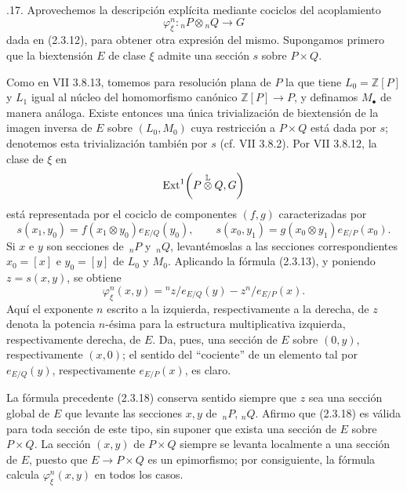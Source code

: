 \par\medskip
{}.17. Aprovechemos la descripción explícita mediante
cociclos del acoplamiento
\[
 \varphi_\xi^n:{}_nP\otimes{}_nQ\longrightarrow G
\]
dada en (2.3.12), para obtener otra expresión del mismo. Supongamos
primero que la biextensión $E$ de clase $\xi$ admite una sección $s$
sobre $P\times Q$.


Como en VII 3.8.13, tomemos para resolución plana de $P$ la que tiene
$L_0=\mathbb Z[P]$ y $L_1$ igual al núcleo del homomorfismo canónico
$\mathbb Z[P]\longrightarrow P$, y definamos $M_\bullet$ de manera
análoga. Existe entonces una única trivialización de biextensión de la
imagen inversa de $E$ sobre $(L_0,M_0)$ cuya restricción a $P\times Q$
está dada por $s$; denotemos esta trivialización también por $s$
(cf. VII 3.8.2). Por VII 3.8.12, la clase de $\xi$ en
\[
 \operatorname{Ext}^1\!\left(
 P\mathbin{\overset{\mathbb L}{\otimes}}Q,G\right)
\]
está representada por el cociclo de componentes $(f,g)$ caracterizadas
por
\[
 s(x_1,y_0)=f(x_1\otimes y_0)e_{E/Q}(y_0),
 \qquad
 s(x_0,y_1)=g(x_0\otimes y_1)e_{E/P}(x_0).
\]
Si $x$ e $y$ son secciones de $\,{}_nP$ y $\,{}_nQ$, levantémoslas a
las secciones correspondientes $x_0=[x]$ e $y_0=[y]$ de $L_0$ y
$M_0$. Aplicando la fórmula (2.3.13), y poniendo $z=s(x,y)$, se
obtiene
\begin{equation}\tag{2.3.18}
 \varphi_\xi^n(x,y)
 ={}^n z/e_{E/Q}(y)-z^n/e_{E/P}(x).
\end{equation}
Aquí el exponente $n$ escrito a la izquierda, respectivamente a la
derecha, de $z$ denota la potencia $n$-ésima para la estructura
multiplicativa izquierda, respectivamente derecha, de $E$. Da, pues,
una sección de $E$ sobre $(0,y)$, respectivamente $(x,0)$; el sentido
del ``cociente'' de un elemento tal por $e_{E/Q}(y)$, respectivamente
$e_{E/P}(x)$, es claro.

La fórmula precedente (2.3.18) conserva sentido siempre que $z$ sea
una sección global de $E$ que levante las secciones $x,y$ de
$\,{}_nP,\,{}_nQ$. Afirmo que (2.3.18) es válida para toda sección de
este tipo, sin suponer que exista una sección de $E$ sobre $P\times Q$.
La sección $(x,y)$ de $P\times Q$ siempre se levanta localmente a una
sección de $E$, puesto que $E\longrightarrow P\times Q$ es un
epimorfismo; por consiguiente, la fórmula calcula
$\varphi_\xi^n(x,y)$ en todos los casos.


